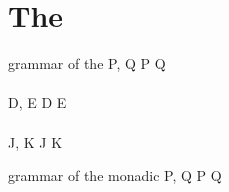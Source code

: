 \section{The \JoinCalc}

\begin{JDef}{grammar of the \joincalc}
  P, Q
  \grmr {}
  \altn {}
  \altn P \jpar Q
  \altn \jnullproc
  \\ \\
  D, E
  \grmr {}
  \altn D \jcon E
  \altn \jnulldef
  \\ \\
  J, K
  \grmr {}
  \altn J \jpat K
\end{JDef}

\begin{JDef}{grammar of the monadic \joincalc}
  P, Q
  \grmr {}
  \altn P \jpar Q
  \altn {}
\end{JDef}

